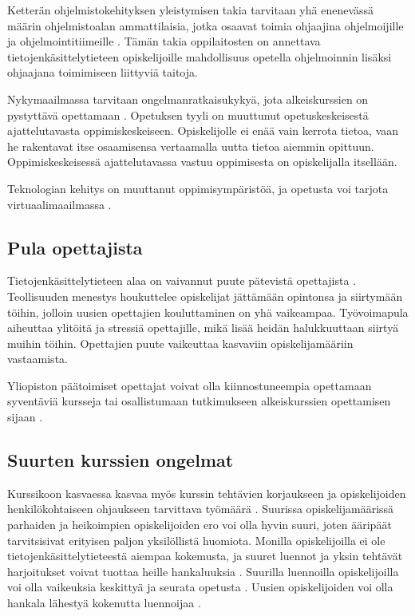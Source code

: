 \documentclass[finnish]{tktltiki2}
\theoremstyle{definition}
\theoremstyle{remark}
\begin{document}
Ketterän ohjelmistokehityksen yleistymisen takia tarvitaan yhä enenevässä määrin ohjelmistoalan ammattilaisia, jotka osaavat toimia ohjaajina ohjelmoijille ja ohjelmointitiimeille \cite{Vikberg}. Tämän takia oppilaitosten on annettava tietojenkäsittelytieteen opiskelijoille mahdollisuus opetella ohjelmoinnin lisäksi ohjaajana toimimiseen liittyviä taitoja. \par

Nykymaailmassa tarvitaan ongelmanratkaisukykyä, jota alkeiskurssien on pystyttävä opettamaan \cite{Yadin11}. Opetuksen tyyli on muuttunut opetuskeskeisestä ajattelutavasta oppimiskeskeiseen. Opiskelijolle ei enää vain kerrota tietoa, vaan he rakentavat itse osaamisensa vertaamalla uutta tietoa aiemmin opittuun. Oppimiskeskeisessä ajattelutavassa vastuu oppimisesta on opiskelijalla itsellään. \par

Teknologian kehitys on muuttanut oppimisympäristöä, ja opetusta voi tarjota virtuaalimaailmassa \cite{Yadin11}. \par

\subsection{Pula opettajista}
Tietojenkäsittelytieteen alaa on vaivannut puute pätevistä opettajista \cite{Roberts99}. Teollisuuden menestys houkuttelee opiskelijat jättämään opintonsa ja siirtymään töihin, jolloin uusien opettajien kouluttaminen on yhä vaikeampaa. Työ\-voi\-ma\-pu\-la aiheuttaa ylitöitä ja stressiä opettajille, mikä lisää heidän halukkuuttaan siirtyä muihin töihin. Opettajien puute vaikeuttaa kasvaviin opiskelijamääriin vastaamista.  \par

Yliopiston päätoimiset opettajat voivat olla kiinnostuneempia opettamaan syventäviä kursseja tai osallistumaan tutkimukseen alkeiskurssien opettamisen sijaan \cite{Shannon98}. \par



\subsection{Suurten kurssien ongelmat}

Kurssikoon kasvaessa kasvaa myös kurssin tehtävien korjaukseen ja opiskelijoiden henkilökohtaiseen ohjaukseen tarvittava työmäärä \cite{Kay98}. Suurissa opiskelijamäärissä parhaiden ja heikoimpien opiskelijoiden ero voi olla hyvin suuri, joten ääripäät tarvitsisivat erityisen paljon yksilöllistä huomiota. Monilla opiskelijoilla ei ole tietojenkäsittelytieteestä aiempaa kokemusta, ja suuret luennot ja yksin tehtävät harjoitukset voivat tuottaa heille hankaluuksia \cite{Murphy11}. Suurilla luennoilla opiskelijoilla voi olla vaikeuksia keskittyä ja seurata opetusta \cite{Boyer07}. Uusien opiskelijoiden voi olla hankala lähestyä kokenutta luennoijaa \cite{Kopp00}. \par
\end{document}
